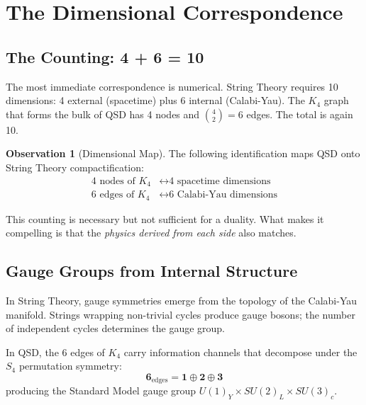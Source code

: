 \documentclass[11pt,a4paper]{article}
\theoremstyle{definition}
\newtheorem{observation}[theorem]{Observation}
\begin{document}
\section{The Dimensional Correspondence}
\label{sec:dimensions}

\subsection{The Counting: 4 + 6 = 10}

The most immediate correspondence is numerical.  String Theory requires
10 dimensions: 4 external (spacetime) plus 6 internal (Calabi-Yau).  The
$K_4$ graph that forms the bulk of QSD has 4 nodes and $\binom{4}{2}=6$
edges.  The total is again 10.

\begin{observation}[Dimensional Map]
\label{obs:dimmap}
The following identification maps QSD onto String Theory compactification:
\begin{align}
\text{4 nodes of } K_4 &\longleftrightarrow \text{4 spacetime dimensions} \\
\text{6 edges of } K_4 &\longleftrightarrow \text{6 Calabi-Yau dimensions}
\end{align}
\end{observation}

This counting is necessary but not sufficient for a duality.  What makes
it compelling is that the \emph{physics derived from each side} also
matches.

\subsection{Gauge Groups from Internal Structure}

In String Theory, gauge symmetries emerge from the topology of the
Calabi-Yau manifold.  Strings wrapping non-trivial cycles produce gauge
bosons; the number of independent cycles determines the gauge group.

In QSD, the 6 edges of $K_4$ carry information channels that decompose
under the $S_4$ permutation symmetry:
\begin{equation}
\mathbf{6}_{\text{edges}} = \mathbf{1} \oplus \mathbf{2} \oplus \mathbf{3}
\end{equation}
producing the Standard Model gauge group $U(1)_Y \times SU(2)_L \times SU(3)_c$.
\end{document}
